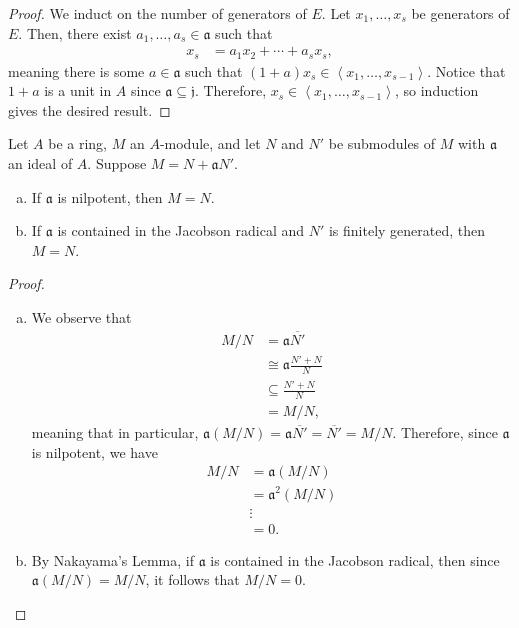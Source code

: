 \documentclass[10pt]{mypackage}
\begin{document}
\begin{proof}
  We induct on the number of generators of $E$. Let $x_1,\dots,x_s$ be generators of $E$. Then, there exist $a_1,\dots,a_s\in \mathfrak{a}$ such that
  \begin{align*}
    x_s &= a_1x_2 + \cdots + a_sx_s,
  \end{align*}
  meaning there is some $a\in \mathfrak{a}$ such that $\left( 1 + a \right)x_s\in \left\langle x_1,\dots,x_{s-1} \right\rangle$. Notice that $1 + a$ is a unit in $ A $ since $ \mathfrak{a}\subseteq \mathfrak{j}$. Therefore, $x_s\in \left\langle x_1,\dots,x_{s-1} \right\rangle$, so induction gives the desired result.
\end{proof}
\begin{corollary}
  Let $A$ be a ring, $M$ an $A$-module, and let $N$ and $N'$ be submodules of $M$ with $ \mathfrak{a} $ an ideal of $A$. Suppose $M = N + \mathfrak{a}N'$.
  \begin{enumerate}[(a)]
    \item If $ \mathfrak{a} $ is nilpotent, then $M = N$.
    \item If $ \mathfrak{a} $ is contained in the Jacobson radical and $N'$ is finitely generated, then $M = N$.
  \end{enumerate}
\end{corollary}
\begin{proof}\hfill
  \begin{enumerate}[(a)]
    \item We observe that
      \begin{align*}
        M/N &= \mathfrak{a} \overline{N'}\\
            &\cong \mathfrak{a}\frac{N' + N}{N}\\
            &\subseteq \frac{N' + N}{N}\\
            &= M/N,
      \end{align*}
      meaning that in particular, $ \mathfrak{a}\left( M/N \right) = \mathfrak{a} \overline{N'} = \overline{N'} = M/N$. Therefore, since $ \mathfrak{a} $ is nilpotent, we have
      \begin{align*}
        M/N &= \mathfrak{a}\left( M/N \right)\\
            &= \mathfrak{a}^2 \left( M/N \right)\\
            &\vdots\\
            &= 0.
      \end{align*}
    \item By Nakayama's Lemma, if $ \mathfrak{a} $ is contained in the Jacobson radical, then since $ \mathfrak{a} \left( M/N \right) = M/N $, it follows that $M/N = 0$.
  \end{enumerate}
\end{proof}
\end{document}
